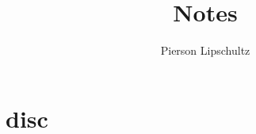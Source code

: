 \documentclass[oneside]{book}
\title{Notes}
\author{Pierson Lipschultz}
\theoremstyle{mytheoremstyle}
\theoremstyle{mytheoremstyle}
\theoremstyle{myproblemstyle}
\theoremstyle{myproblemstyle}
\begin{document}
    \pagestyle{fancy}

    \fancyhf{}
    \fancyfoot[L]{\nouppercase{\leftmark}} %
    \fancyfoot[R]{\thepage}%

    \renewcommand{\headrulewidth}{0pt}
    \renewcommand{\footrulewidth}{0.4pt}
    \renewcommand{\sectionmark}[1]{\markboth{#1}{}}

    \maketitle
    \tableofcontents

    

\chapter{disc}



\pagebreak
\PrintAllEquations
\PrintAllConstants
\tikzifexternalizing{}{%
  \printglossaries
}
\end{document}

